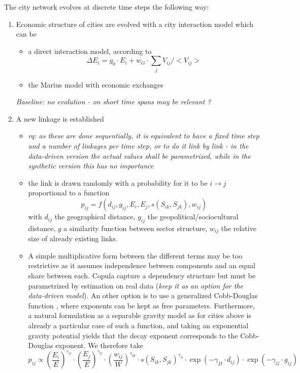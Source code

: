 \documentclass{article}
\begin{document}

The city network evolves at discrete time steps the following way:
\begin{enumerate}
    \item Economic structure of cities are evolved with a city interaction model which can be
    \begin{itemize}
        \item a direct interaction model, according to
        \begin{equation}
            \Delta E_i = g_0\cdot E_i + w_G \cdot \sum_j V_{ij}/<V_{ij}>
        \end{equation}
        \item the Marius model with economic exchanges
    \end{itemize}
    \textit{Baseline: no evolution - on short time spans may be relevant ?}
    \item A new linkage is established
    \begin{itemize}
        \item \textit{rq: as these are done sequentially, it is equivalent to have a fixed time step and a number of linkages per time step, or to do it link by link - in the data-driven version the actual values shall be parametrized, while in the synthetic version this has no importance}
        \item the link is drawn randomly with a probability for it to be $i \rightarrow j$ proportional to a function
    \begin{equation}
        p_{ij} = f(d_{ij},g_{ij},E_i,E_j,s(S_{ik},S_{jk}),w_{ij})
    \end{equation}
    with $d_{ij}$ the geographical distance, $g_{ij}$ the geopolitical/sociocultural distance, $g$ a similarity function between sector structure, $w_{ij}$ the relative size of already existing links.
    \item A simple multiplicative form between the different terms may be too restrictive as it assumes independence between components and an equal share between each. Copula capture a dependency structure but must be parametrized by estimation on real data (\textit{keep it as an option for the data-driven model}). An other option is to use a generalized Cobb-Douglas function \citep{vilcu2011geometric}, where exponents can be kept as free parameters. Furthermore, a natural formulation as a separable gravity model as for cities above is already a particular case of such a function, and taking an exponential gravity potential yields that the decay exponent corresponds to the Cobb-Douglas exponent. We therefore take
    \begin{equation}
     p_{ij} \propto \left(\frac{E_{i}}{E}\right)^{\gamma_F} \cdot \left(\frac{E_{j}}{E}\right)^{\gamma_T} \cdot \left(\frac{w_{ij}}{W}\right)^{\gamma_W} \cdot s(S_{ik},S_{jk})^{\gamma_S} \cdot \exp \left(- \gamma_D \cdot d_{ij}\right) \cdot \exp \left(- \gamma_G \cdot g_{ij}\right)
    \end{equation}
    

\end{itemize}
\end{enumerate}
\end{document}
